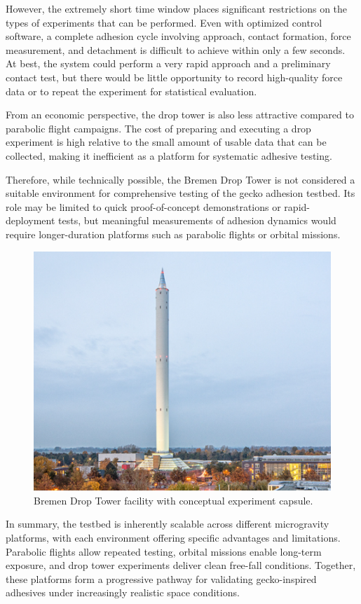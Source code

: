 \documentclass[
    twocolumn,
    fontsize = 10pt,
    parskip = half+,
    headings = small,
    headwidth = text,
    footwidth = text,
]{scrartcl}
\begin{document}
However, the extremely short time window places significant restrictions on the types of experiments that can be performed. 
Even with optimized control software, a complete adhesion cycle involving approach, contact formation, 
force measurement, and detachment is difficult to achieve within only a few seconds. 
At best, the system could perform a very rapid approach and a preliminary contact test, 
but there would be little opportunity to record high-quality force data or to repeat the experiment for statistical evaluation.  

From an economic perspective, the drop tower is also less attractive compared to parabolic flight campaigns. 
The cost of preparing and executing a drop experiment is high relative to the small amount of usable data that can be collected, 
making it inefficient as a platform for systematic adhesive testing.  

Therefore, while technically possible, the Bremen Drop Tower is not considered a suitable environment for 
comprehensive testing of the gecko adhesion testbed. 
Its role may be limited to quick proof-of-concept demonstrations or rapid-deployment tests, 
but meaningful measurements of adhesion dynamics would require longer-duration platforms such as parabolic flights or orbital missions.


\begin{figure}[h!]
    \centering
    \includegraphics[width=0.7\linewidth]{pics/bremen.png}
    \caption{Bremen Drop Tower facility with conceptual experiment capsule.}
    \label{fig:bremen}
\end{figure}


In summary, the testbed is inherently scalable across different microgravity platforms, 
with each environment offering specific advantages and limitations. 
Parabolic flights allow repeated testing, orbital missions enable long-term exposure, 
and drop tower experiments deliver clean free-fall conditions. 
Together, these platforms form a progressive pathway for validating gecko-inspired adhesives under increasingly realistic space conditions.
\end{document}
